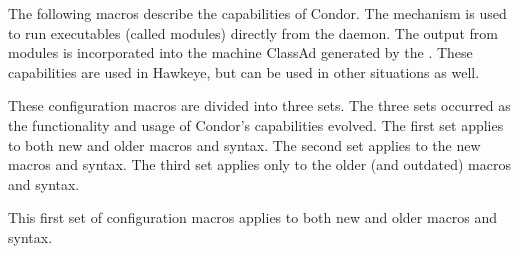 The following macros describe the  capabilities of Condor.
The  mechanism is used to run executables (called
modules) directly from the  daemon.
The output from modules
is incorporated into the machine ClassAd generated by the
.  These capabilities are used in Hawkeye, but can be
used in other situations as well.

These configuration macros are divided into three sets.
The three sets occurred as the functionality and usage of
Condor's  capabilities evolved.
The first set applies to both new and older macros and syntax.
The second set applies to the new macros and syntax.
The third set applies only to the older (and outdated) macros and syntax.


This first set of configuration macros applies to both new
and older macros and syntax.
